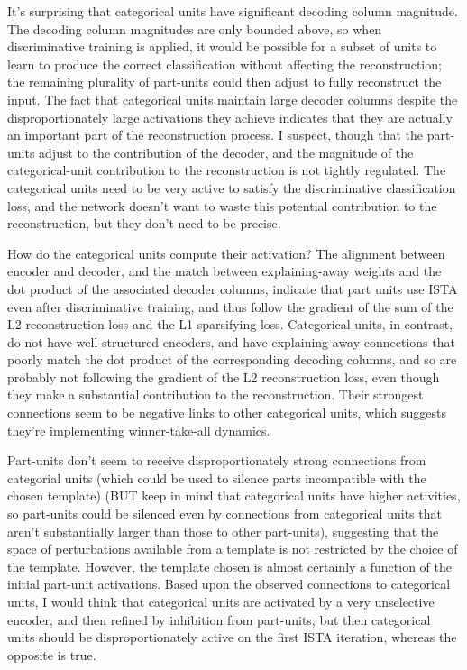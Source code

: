 It's surprising that categorical units have significant decoding column magnitude.  The decoding column magnitudes are only bounded above, so when discriminative training is applied, it would be possible for a subset of units to learn to produce the correct classification without affecting the reconstruction; the remaining plurality of part-units could then adjust to fully reconstruct the input.  The fact that categorical units maintain large decoder columns despite the disproportionately large activations they achieve indicates that they are actually an important part of the reconstruction process.  I suspect, though that the part-units adjust to the contribution of the decoder, and the magnitude of the categorical-unit contribution to the reconstruction is not tightly regulated.  The categorical units need to be very active to satisfy the discriminative classification loss, and the network doesn't want to waste this potential contribution to the reconstruction, but they don't need to be precise.

How do the categorical units compute their activation?  The alignment between encoder and decoder, and the match between explaining-away weights and the dot product of the associated decoder columns, indicate that part units use ISTA even after discriminative training, and thus follow the gradient of the sum of the L2 reconstruction loss and the L1 sparsifying loss.  Categorical units, in contrast, do not have well-structured encoders, and have explaining-away connections that poorly match the dot product of the corresponding decoding columns, and so are probably not following the gradient of the L2 reconstruction loss, even though they make a substantial contribution to the reconstruction.  Their strongest connections seem to be negative links to other categorical units, which suggests they're implementing winner-take-all dynamics.  

Part-units don't seem to receive disproportionately strong connections from categorial units (which could be used to silence parts incompatible with the chosen template) (BUT keep in mind that categorical units have higher activities, so part-units could be silenced even by connections from categorical units that aren't substantially larger than those to other part-units), suggesting that the space of perturbations available from a template is not restricted by the choice of the template.  However, the template chosen is almost certainly a function of the initial part-unit activations.  Based upon the observed connections to categorical units, I would think that categorical units are activated by a very unselective encoder, and then refined by inhibition from part-units, but then categorical units should be disproportionately active on the first ISTA iteration, whereas the opposite is true.

